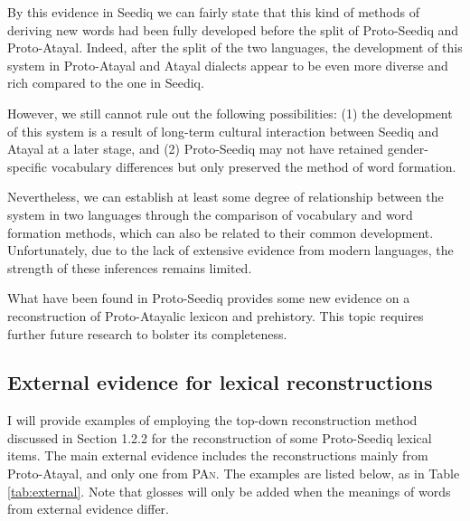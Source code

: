 \documentclass[12pt]{article}
\newcommand{\pan}{\textsc{PAn}\xspace}
\newcommand{\pataf}{Proto-Atayal\xspace}
\newcommand{\psedf}{Proto-Seediq\xspace}
\begin{document}
By this evidence in Seediq we can fairly state that this kind of methods of deriving new words had been fully developed before the split of \psedf and \pataf. Indeed, after the split of the two languages, the development of this system in \pataf and Atayal dialects appear to be even more diverse and rich compared to the one in Seediq. 

However, we still cannot rule out the following possibilities: (1) the development of this system is a result of long-term cultural interaction between Seediq and Atayal at a later stage, and (2) \psedf may not have retained gender-specific vocabulary differences but only preserved the method of word formation. 

Nevertheless, we can establish at least some degree of relationship between the system in two languages through the comparison of vocabulary and word formation methods, which can also be related to their common development. Unfortunately, due to the lack of extensive evidence from modern languages, the strength of these inferences remains limited.

What have been found in \psedf provides some new evidence on a reconstruction of Proto-Atayalic lexicon and prehistory. This topic requires further future research to bolster its completeness.

\subsection{External evidence for lexical reconstructions}

I will provide examples of employing the top-down reconstruction method discussed in Section 1.2.2 for the reconstruction of some \psedf lexical items. The main external evidence includes the reconstructions mainly from \pataf, and only one from \pan. The examples are listed below, as in Table \ref{tab:external}. Note that glosses will only be added when the meanings of words from external evidence differ.
\end{document}
